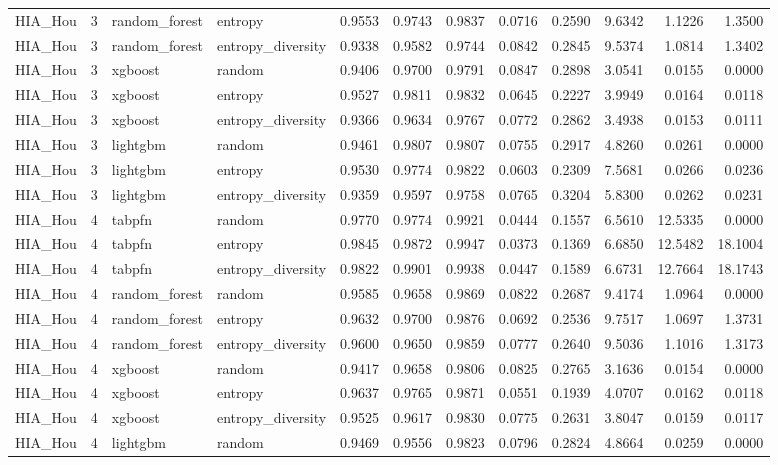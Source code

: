 \begin{tabular}{lrllrrrrrrrr}
HIA_Hou & 3 & random_forest & entropy & 0.9553 & 0.9743 & 0.9837 & 0.0716 & 0.2590 & 9.6342 & 1.1226 & 1.3500 \\
HIA_Hou & 3 & random_forest & entropy_diversity & 0.9338 & 0.9582 & 0.9744 & 0.0842 & 0.2845 & 9.5374 & 1.0814 & 1.3402 \\
HIA_Hou & 3 & xgboost & random & 0.9406 & 0.9700 & 0.9791 & 0.0847 & 0.2898 & 3.0541 & 0.0155 & 0.0000 \\
HIA_Hou & 3 & xgboost & entropy & 0.9527 & 0.9811 & 0.9832 & 0.0645 & 0.2227 & 3.9949 & 0.0164 & 0.0118 \\
HIA_Hou & 3 & xgboost & entropy_diversity & 0.9366 & 0.9634 & 0.9767 & 0.0772 & 0.2862 & 3.4938 & 0.0153 & 0.0111 \\
HIA_Hou & 3 & lightgbm & random & 0.9461 & 0.9807 & 0.9807 & 0.0755 & 0.2917 & 4.8260 & 0.0261 & 0.0000 \\
HIA_Hou & 3 & lightgbm & entropy & 0.9530 & 0.9774 & 0.9822 & 0.0603 & 0.2309 & 7.5681 & 0.0266 & 0.0236 \\
HIA_Hou & 3 & lightgbm & entropy_diversity & 0.9359 & 0.9597 & 0.9758 & 0.0765 & 0.3204 & 5.8300 & 0.0262 & 0.0231 \\
HIA_Hou & 4 & tabpfn & random & 0.9770 & 0.9774 & 0.9921 & 0.0444 & 0.1557 & 6.5610 & 12.5335 & 0.0000 \\
HIA_Hou & 4 & tabpfn & entropy & 0.9845 & 0.9872 & 0.9947 & 0.0373 & 0.1369 & 6.6850 & 12.5482 & 18.1004 \\
HIA_Hou & 4 & tabpfn & entropy_diversity & 0.9822 & 0.9901 & 0.9938 & 0.0447 & 0.1589 & 6.6731 & 12.7664 & 18.1743 \\
HIA_Hou & 4 & random_forest & random & 0.9585 & 0.9658 & 0.9869 & 0.0822 & 0.2687 & 9.4174 & 1.0964 & 0.0000 \\
HIA_Hou & 4 & random_forest & entropy & 0.9632 & 0.9700 & 0.9876 & 0.0692 & 0.2536 & 9.7517 & 1.0697 & 1.3731 \\
HIA_Hou & 4 & random_forest & entropy_diversity & 0.9600 & 0.9650 & 0.9859 & 0.0777 & 0.2640 & 9.5036 & 1.1016 & 1.3173 \\
HIA_Hou & 4 & xgboost & random & 0.9417 & 0.9658 & 0.9806 & 0.0825 & 0.2765 & 3.1636 & 0.0154 & 0.0000 \\
HIA_Hou & 4 & xgboost & entropy & 0.9637 & 0.9765 & 0.9871 & 0.0551 & 0.1939 & 4.0707 & 0.0162 & 0.0118 \\
HIA_Hou & 4 & xgboost & entropy_diversity & 0.9525 & 0.9617 & 0.9830 & 0.0775 & 0.2631 & 3.8047 & 0.0159 & 0.0117 \\
HIA_Hou & 4 & lightgbm & random & 0.9469 & 0.9556 & 0.9823 & 0.0796 & 0.2824 & 4.8664 & 0.0259 & 0.0000 \\

\end{tabular}
